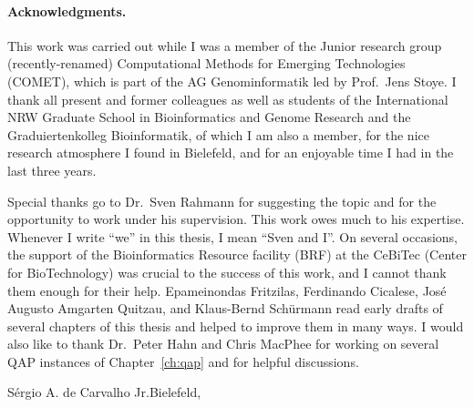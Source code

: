 \paragraph{Acknowledgments.}
This work was carried out while I was a member of the Junior research group
(recently-renamed) Computational Methods for Emerging Technologies (COMET), which
is part of the AG Genominformatik led by Prof.~Jens Stoye. I thank all present
and former colleagues as well as students of the International NRW Graduate
School in Bioinformatics and Genome Research and the Graduiertenkolleg
Bioinformatik, of which I am also a member, for the nice research atmosphere I
found in Bielefeld, and for an enjoyable time I had in the last three years.

Special thanks go to Dr.~Sven Rahmann for suggesting the topic and for the
opportunity to work under his supervision. This work owes much to his expertise.
Whenever I write ``we'' in this thesis, I mean ``Sven and I''. On several
occasions, the support of the Bioinformatics Resource facility (BRF) at the
CeBiTec (Center for BioTechnology) was crucial to the success of this work,
and I cannot thank them enough for their help. Epameinondas Fritzilas,
Ferdinando Cicalese, Jos\'e Augusto Amgarten Quitzau, and Klaus-Bernd
Sch\"urmann read early drafts of several chapters of this thesis and helped to
improve them in many ways. I would also like to thank Dr.~Peter Hahn and Chris
MacPhee for working on several QAP instances of Chapter~\ref{ch:qap} and for
helpful discussions.

\vspace*{6ex}
S\'ergio A. de Carvalho Jr.\hfill Bielefeld, \handindate
